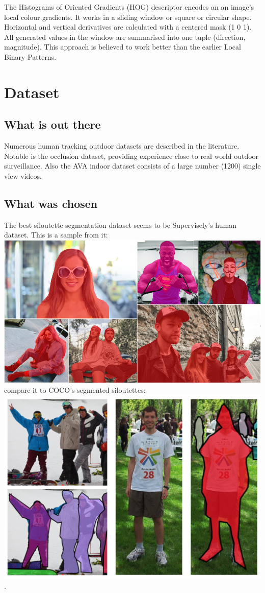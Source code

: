 \documentclass{article}
\begin{document}
The Histograms of Oriented Gradients (HOG)\cite{hog} descriptor encodes an an image's local colour gradients.
It works in a sliding window or square or circular shape.
Horizontal and vertical derivatives are calculated with a centered mask (1 0 1).
All generated values in the window are summarised into one tuple (direction, magnitude).
This approach is believed to work better than the earlier Local Binary Patterns.


\section{Dataset}
\subsection{What is out there}
Numerous human tracking outdoor datasets are described in the literature\cite{datasets0}\cite{datasets1}.
Notable is the occlusion dataset\cite{datasets2}, providing experience close to real world outdoor surveillance.
Also the AVA indoor dataset\cite{ava} consists of a large number (1200) single view videos.

\subsection{What was chosen}
The best siloutette segmentation dataset seems to be Supervisely's human dataset\cite{supervisely}. This is a sample from it:
\\
\includegraphics[height=0.5\textwidth]{../img/supervisely}
\\
compare it to COCO's segmented siloutettes:
\\
\includegraphics[height=0.5\textheight]{../img/coco}.
\end{document}
